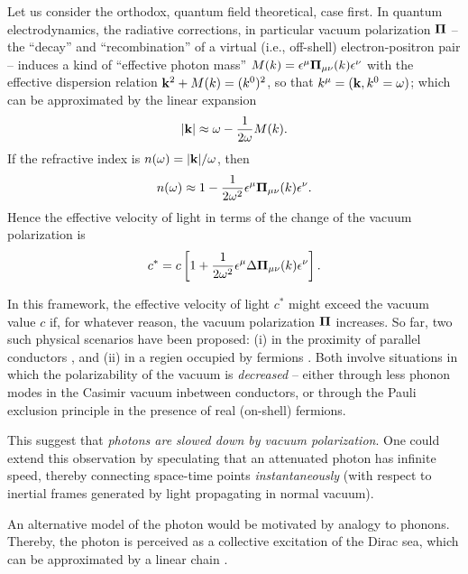 \documentclass[%
 reprint,
 showpacs,
 showkeys,
 preprintnumbers,
 amsmath,amssymb,
 aps,
 prl,
  longbibliography,
 ]{revtex4-1}
\theoremstyle{definition}
\theoremstyle{remark}
\begin{document}
Let us consider the orthodox, quantum field theoretical, case first.
In quantum electrodynamics, the radiative corrections,  in particular vacuum polarization ${\bf \Pi}$
-- the ``decay'' and ``recombination'' of a virtual (i.e., off-shell) electron-positron pair --
induces a kind of ``effective photon mass'' \cite{PhysRev.82.664,PhysRevD.10.492,PhysRevD.12.1132}
$
M(k)=\epsilon^\mu {\bf \Pi}_{\mu \nu}(k)\epsilon^\nu
$
with the effective dispersion relation
$
{\bf k}^2+ M(k)=(k^0)^2
$,
so that $k^\mu=({\bf k},k^0=\omega)$;
which can be approximated by the linear expansion
\begin{equation}
\vert  {\bf k} \vert \approx \omega - \frac{1}{2 \omega} M(k).
\end{equation}
If the refractive index is
$n(\omega )= \vert {\bf k} \vert / \omega  $,
then
\begin{equation}
n(\omega )\approx 1 - \frac{1}{2 \omega^2}\epsilon^\mu {\bf \Pi}_{\mu \nu}(k)\epsilon^\nu .
\end{equation}
Hence the effective  velocity of light in terms of the change of the vacuum polarization is
\begin{equation}
c^\ast
=
c\left[1+  \frac{1}{2 \omega^2}\epsilon^\mu {\rm \Delta }{\bf \Pi}_{\mu \nu}(k)\epsilon^\nu \right]
.
\label{2013-c}
\end{equation}

In this framework, the effective velocity of light $c^\ast$ might exceed the vacuum value $c$ if,
for whatever reason,
the vacuum polarization ${\bf \Pi}$ increases.
So far, two such physical scenarios have been proposed:
(i) in the proximity of parallel conductors \citep{scharnhorst,milonni,Scharnhorst-1998,barton,0305-4470-26-8-024},
and
(ii) in a regien occupied by fermions
\cite{svozil-putz-sol}.
Both involve situations in which the polarizability of the vacuum is {\em decreased}
--
either through less phonon modes in the Casimir vacuum inbetween conductors,
or through the Pauli exclusion principle in the presence of real (on-shell) fermions.

This suggest that {\em photons are slowed down by vacuum polarization}.
One could extend this observation by speculating that an attenuated photon has infinite speed,
thereby connecting space-time points {\em instantaneously}
(with respect to inertial frames generated by light propagating in normal vacuum).

An alternative model of the photon would be motivated by analogy to phonons.
Thereby, the photon is perceived as a collective excitation of the Dirac sea,
which can be approximated by a linear chain \cite{Henley-Thirring-EQFT}.
\end{document}
